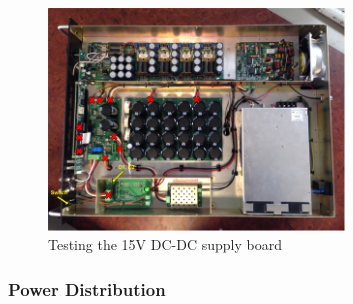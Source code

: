 \begin{figure}[H]
	\centering
	\includegraphics[width=0.7\textwidth]{images/hardware/box_dc.jpg}
	\caption{Testing the 15V DC-DC supply board}
	\label{fig:hw_box_dc}
\end{figure}

\subsubsection{Power Distribution}

